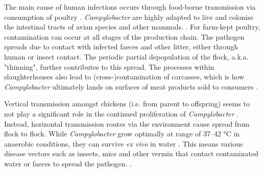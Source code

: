 The main cause of human infections occurs through food-borne transmission via consumption of poultry \parencite{wilson_tracing_2008}. \textit{Campylobacter} are highly adapted to live and colonise the intestinal tracts of avian species and other mammals. \parencite{saif_diseases_2008}. For farm-kept poultry, contamination can occur at all stages of the production chain. The pathogen spreads due to contact with infected faeces and other litter, either through human or insect contact. The periodic partial depopulation of the flock, a.k.a. "thinning", further contributes to this spread. The processes within slaughterhouses also lead to (cross-)contamination of carcasses, which is how \textit{Campylobacter} ultimately lands on surfaces of meat products sold to consumers \parencite{skarp_campylobacteriosis_2015}.

Vertical transmission amongst chickens (i.e. from parent to offspring) seems to not play a significant role in the continued proliferation of \textit{Campylobacter} \parencite{callicott_lack_2006}. Instead, horizontal transmission routes via the environment cause spread from flock to flock. While \textit{Campylobacter} grow optimally at range of 37–42 °C in anaerobic conditions, they can survive \textit{ex vivo} in water \parencite{wilson_tracing_2008}. This means various disease vectors such as insects, mice and other vermin that contact contaminated water or faeces to spread the pathogen. \parencite{newell_sources_2003}.




